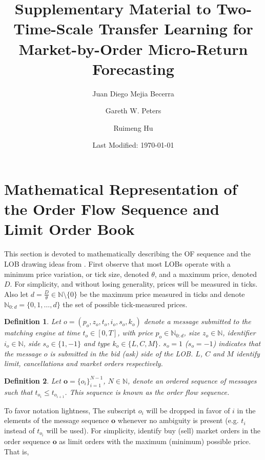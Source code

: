 \documentclass[10pt,a4paper,oneside]{article}
\title{Supplementary Material to Two-Time-Scale Transfer Learning for Market-by-Order Micro-Return Forecasting}
\author[1]{Juan Diego Mejia Becerra}
\author[1]{Gareth W. Peters}
\author[1,2]{Ruimeng Hu}
\affil[1]{Department of Statistics and Applied Probability, University of California, Santa Barbara}
\affil[2]{Department of Mathematics, University of California, Santa Barbara}
\date{Last Modified: \today}
\newcommand{\N}{\mathbb{N}}
\newtheorem{definition}{Definition}
\begin{document}
\maketitle

\tableofcontents
\clearpage


\appendix

\section{Mathematical Representation of the Order Flow Sequence and Limit Order Book}
\label{ap:matreplob}


This section is devoted to mathematically describing the OF sequence and the LOB drawing ideas from \cite{cont2023mathematical, gould2013limit, panayi2015stochastic}. First observe that most LOBs operate with a minimum price variation, or tick size, denoted $\theta$, and a maximum price, denoted $D$. For simplicity, and without losing generality, prices will be measured in ticks. Also let $d = \frac{D}{\theta} \in \N \setminus \{ 0 \}$ be the maximum price measured in ticks and denote $\N_{0:d} = \{ 0, 1, \dots, d\}$ the set of possible tick-measured prices.

\begin{definition}
    Let $o = (p_o, z_o, t_o, i_o, s_o, k_o)$ denote a message submitted to the matching engine at time $t_o \in [0, T]$, with price $p_o \in \N_{0:d}$, size $z_o \in \N$, identifier $i_o \in \N$, side $s_o \in \{1, -1\}$ and type $k_o \in \{L, C, M \}$. $s_o = 1$ ($s_o = -1$) indicates that the message $o$ is submitted in the bid (ask) side of the LOB. $L$, $C$ and $M$ identify limit, cancellations and market orders respectively. 
    \label{def:order}
\end{definition}

\begin{definition}
    Let $\mathbf{o} = \{o_i\}^{N - 1}_{i = 1} $, $N \in \N$, denote an ordered sequence of messages such that $t_{o_i} \leq t_{o_{i + 1}}$. This sequence is known as the order flow sequence.
\label{def:order_seq}
\end{definition}

To favor notation lightness, The subscript $o_i$ will be dropped in favor of $i$ in the elements of the message sequence $\mathbf{o}$ whenever no ambiguity is present (e.g. $t_i$ instead of $t_{o_i}$ will be used). For simplicity, identify buy (sell) market orders in the order sequence $\mathbf{o}$ as limit orders with the maximum (minimum) possible price. That is, 
\end{document}
